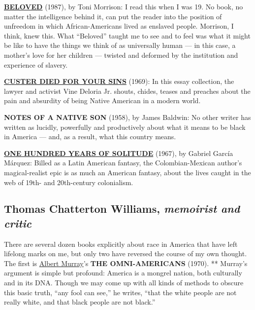 \textbf{\href{https://archive.nytimes.com/www.nytimes.com/books/98/01/11/home/14013.html?mcubz=3}{BELOVED}}
(1987), by Toni Morrison: I read this when I was 19. No book, no matter
the intelligence behind it, can put the reader into the position of
unfreedom in which African-Americans lived as enslaved people. Morrison,
I think, knew this. What ``Beloved'' taught me to see and to feel was
what it might be like to have the things we think of as universally
human --- in this case, a mother's love for her children --- twisted and
deformed by the institution and experience of slavery.

\textbf{\href{https://www.nytimes.com/1969/11/09/archives/custer-died-for-your-sins-an-indian-manifesto-by-vine-deloria-jr.html}{CUSTER
DIED FOR YOUR SINS}} (1969): In this essay collection, the lawyer and
activist Vine Deloria Jr. shouts, chides, teases and preaches about the
pain and absurdity of being Native American in a modern world.

\textbf{NOTES OF A NATIVE SON} (1958), by James Baldwin: No other writer
has written as lucidly, powerfully and productively about what it means
to be black in America --- and, as a result, what this country means.

\textbf{\href{https://www.nytimes.com/1970/03/08/archives/one-hundred-years-of-solitude-memory-and-prophecy-illusion-and.html}{ONE
HUNDRED YEARS OF SOLITUDE}} (1967), by Gabriel García Márquez: Billed as
a Latin American fantasy, the Colombian-Mexican author's magical-realist
epic is as much an American fantasy, about the lives caught in the web
of 19th- and 20th-century colonialism.

\hypertarget{thomas-chatterton-williams-memoirist-and-critic}{%
\subsection{\texorpdfstring{Thomas Chatterton Williams, \emph{memoirist
and
critic}}{Thomas Chatterton Williams, memoirist and critic}}\label{thomas-chatterton-williams-memoirist-and-critic}}

There are several dozen books explicitly about race in America that have
left lifelong marks on me, but only two have reversed the course of my
own thought. The first is
\href{https://www.nytimes.com/2013/08/20/books/albert-murray-essayist-who-challenged-the-conventional-dies-at-97.html}{Albert
Murray}'s \textbf{THE OMNI-AMERICANS} (1970). ** Murray's argument is
simple but profound: America is a mongrel nation, both culturally and in
its DNA. Though we may come up with all kinds of methods to obscure this
basic truth, ``any fool can see,'' he writes, ``that the white people
are not really white, and that black people are not black.''


